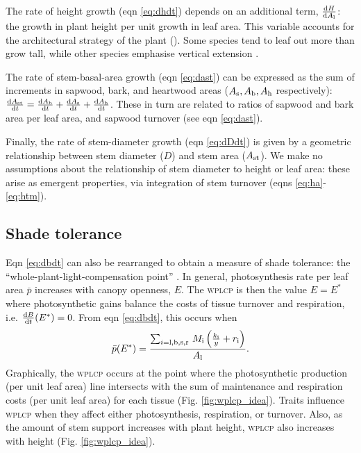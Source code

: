 \documentclass[9pt,twocolumn,twoside,lineno]{pnas-new}
\newcommand{\wplcp}{\textsc{wplcp}}
\begin{document}
The rate of height growth (eqn \ref{eq:dhdt}) depends on an additional term, $\frac{{\rm d}H }{{\rm d}A_{\rm l}}$: the growth in plant height per unit growth in leaf area. This variable accounts for the architectural strategy of the plant (\citep{Falster-2011}). Some species tend to leaf out more than grow tall, while other species emphasise vertical extension \citep{Poorter-2006}.

The rate of stem-basal-area growth (eqn \ref{eq:dast}) can be expressed as the sum of increments in sapwood, bark, and heartwood areas ($A_{\rm s}, A_{\rm b}, A_{\rm h}$ respectively): $\frac{{\rm d}A_{\rm st}}{{\rm d}t}= \frac{{\rm d}A_{\rm b}}{{\rm d}t} + \frac{{\rm d}A_{\rm s}}{{\rm d}t} + \frac{{\rm d}A_{\rm h}}{{\rm d}t}$. These in turn are related to ratios of sapwood and bark area per leaf area, and sapwood turnover (see eqn \ref{eq:dast}).

Finally, the rate of stem-diameter growth (eqn \ref{eq:dDdt}) is given by a geometric relationship between stem diameter ($D$) and stem area ($A_{\rm st}$). We make no assumptions about the relationship of stem diameter to height or leaf area: these arise as emergent properties, via integration of stem turnover (eqns \ref{eq:ha}-\ref{eq:htm}).



\subsection*{Shade tolerance}

Eqn \ref{eq:dbdt} can also be rearranged to obtain a measure of shade tolerance: the ``whole-plant-light-compensation point'' \citep[{\wplcp}][]{Givnish-1988, Baltzer-2007, Lusk-2013} . In general, photosynthesis rate per leaf area $\bar{p}$ increases with canopy openness, $E$. The {\wplcp} is then the value $E=E^*$ where photosynthetic gains balance the costs of tissue turnover and respiration, i.e. $\frac{{\rm d}B}{{\rm d}t}(E^*)=0$. From eqn \ref{eq:dbdt}, this occurs when
\begin{equation}\label{eq:wplcp}
\bar{p}(E^*) =\frac{\sum_{i={\rm l,b,s,r}} \, M_{\rm i} \left(\frac{k_{\rm i}}{y} + r_{\rm i}\right)}{A_{\rm l}}.
\end{equation}
Graphically, the {\wplcp} occurs at the point where the photosynthetic production (per unit leaf area) line intersects with the sum of maintenance and respiration costs (per unit leaf area) for each tissue (Fig. \ref{fig:wplcp_idea}). Traits influence {\wplcp} when they affect either photosynthesis, respiration, or turnover. Also, as the amount of stem support increases with plant height, {\wplcp} also increases with height \citep{Givnish-1988} (Fig. \ref{fig:wplcp_idea}).
\end{document}
